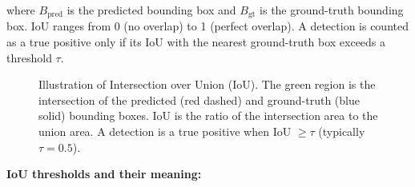 \documentclass[12pt,a4paper]{report}
\begin{document}
where $B_{\text{pred}}$ is the predicted bounding box and $B_{\text{gt}}$
is the ground-truth bounding box. IoU ranges from 0 (no overlap) to 1
(perfect overlap). A detection is counted as a true positive only if its
IoU with the nearest ground-truth box exceeds a threshold $\tau$.

\begin{figure}[H]
\centering
{}
\caption{Illustration of Intersection over Union (IoU). The green region is
the intersection of the predicted (red dashed) and ground-truth (blue solid)
bounding boxes. IoU is the ratio of the intersection area to the union area.
A detection is a true positive when IoU $\geq \tau$ (typically $\tau = 0.5$).}
\label{fig:iou}
\end{figure}

\textbf{IoU thresholds and their meaning:}
\end{document}
